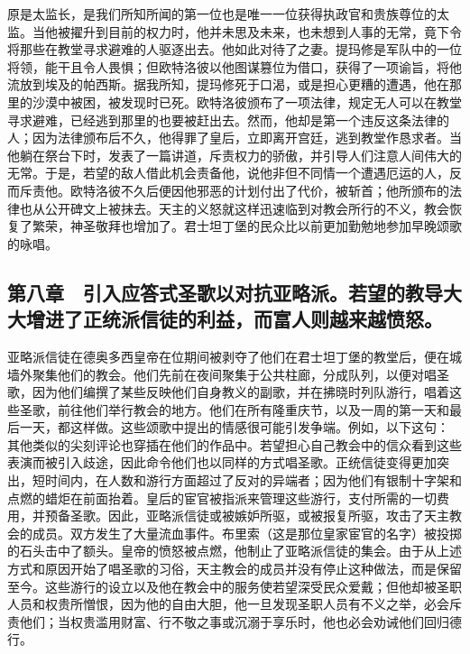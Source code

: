 原是太监长，是我们所知所闻的第一位也是唯一一位获得执政官和贵族尊位的太监。当他被擢升到目前的权力时，他并未思及未来，也未想到人事的无常，竟下令将那些在教堂寻求避难的人驱逐出去。他如此对待了之妻。提玛修是军队中的一位将领，能干且令人畏惧；但欧特洛彼以他图谋篡位为借口，获得了一项谕旨，将他流放到埃及的帕西斯。据我所知，提玛修死于口渴，或是担心更糟的遭遇，他在那里的沙漠中被困，被发现时已死。欧特洛彼颁布了一项法律，规定无人可以在教堂寻求避难，已经逃到那里的也要被赶出去。然而，他却是第一个违反这条法律的人；因为法律颁布后不久，他得罪了皇后，立即离开宫廷，逃到教堂作恳求者。当他躺在祭台下时，发表了一篇讲道，斥责权力的骄傲，并引导人们注意人间伟大的无常。于是，若望的敌人借此机会责备他，说他非但不同情一个遭遇厄运的人，反而斥责他。欧特洛彼不久后便因他邪恶的计划付出了代价，被斩首；他所颁布的法律也从公开碑文上被抹去。天主的义怒就这样迅速临到对教会所行的不义，教会恢复了繁荣，神圣敬拜也增加了。君士坦丁堡的民众比以前更加勤勉地参加早晚颂歌的咏唱。\par


\subsection{第八章　引入应答式圣歌以对抗亚略派。若望的教导大大增进了正统派信徒的利益，而富人则越来越愤怒。}

亚略派信徒在德奥多西皇帝在位期间被剥夺了他们在君士坦丁堡的教堂后，便在城墙外聚集他们的教会。他们先前在夜间聚集于公共柱廊，分成队列，以便对唱圣歌，因为他们编撰了某些反映他们自身教义的副歌，并在拂晓时列队游行，唱着这些圣歌，前往他们举行教会的地方。他们在所有隆重庆节，以及一周的第一天和最后一天，都这样做。这些颂歌中提出的情感很可能引发争端。例如，以下这句： 其他类似的尖刻评论也穿插在他们的作品中。若望担心自己教会中的信众看到这些表演而被引入歧途，因此命令他们也以同样的方式唱圣歌。正统信徒变得更加突出，短时间内，在人数和游行方面超过了反对的异端者；因为他们有银制十字架和点燃的蜡炬在前面抬着。皇后的宦官被指派来管理这些游行，支付所需的一切费用，并预备圣歌。因此，亚略派信徒或被嫉妒所驱，或被报复所驱，攻击了天主教会的成员。双方发生了大量流血事件。布里索（这是那位皇家宦官的名字）被投掷的石头击中了额头。皇帝的愤怒被点燃，他制止了亚略派信徒的集会。由于从上述方式和原因开始了唱圣歌的习俗，天主教会的成员并没有停止这种做法，而是保留至今。这些游行的设立以及他在教会中的服务使若望深受民众爱戴；但他却被圣职人员和权贵所憎恨，因为他的自由大胆，他一旦发现圣职人员有不义之举，必会斥责他们；当权贵滥用财富、行不敬之事或沉溺于享乐时，他也必会劝诫他们回归德行。\par

